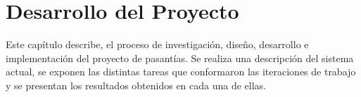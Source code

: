 \chapter{Desarrollo del Proyecto} \label{chap:desarrollo}

\vspace{5 mm}

Este capítulo describe, el proceso de investigación, diseño, desarrollo e implementación del proyecto de pasantías. Se realiza una descripción del sistema actual, se exponen las distintas tareas que conformaron las iteraciones de trabajo y se presentan los resultados obtenidos en cada una de ellas.

